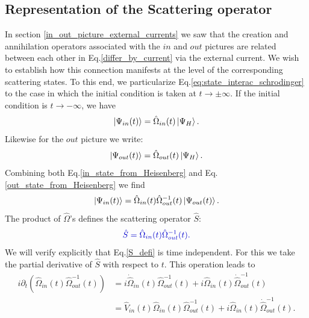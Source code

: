 \documentclass[12pt, titlepage]{article}
\begin{document}
\subsection{Representation of the Scattering operator}\label{Connections}
In section \ref{in_out_picture_external_currents} we saw that the creation and annihilation operators associated with the $ in $ and $ out $ pictures are related between each other in Eq.\enskip\eqref{differ_by_current} via the external current. 
We wish to establish how this connection manifests at the level of the corresponding scattering states. To this end, we particularize Eq.\enskip\eqref{eq:state_interac_schrodinger} to the case in which the initial condition is taken at $ t \rightarrow \pm \infty $.
If the initial condition is $ t \rightarrow - \infty $, we have
\begin{equation}\label{in_state_from_Heisenberg}
\ket{\Psi_{in}(t)}=\hat{\Omega}_{in}(t)\ket{\Psi_{H}}.
\end{equation}
Likewise for the $ out $ picture we write:
\begin{equation}\label{out_state_from_Heisenberg}
\ket{\Psi_{out}(t)}=\hat{\Omega}_{out}(t)\ket{\Psi_{H}}.
\end{equation}
Combining both Eq.\enskip\eqref{in_state_from_Heisenberg} and Eq.\enskip\eqref{out_state_from_Heisenberg} we find
\begin{equation}\label{in_to_out_state}
\ket{\Psi_{in}(t)}=\hat{\Omega}_{in}(t)\hat{\Omega}^{-1}_{out}(t)\ket{\Psi_{out}(t)}.
\end{equation}
The product of $ \hat{\Omega} $'s defines the scattering operator $ \hat{S} $:%
\begin{equation}\label{S_defi}
\textcolor[RGB]{0,0,204}{
	\hat{S}=
	\hat{\Omega}_{in}(t)\hat{\Omega}^{-1}_{out}(t)
	.
}
\end{equation}
We will verify explicitly that Eq.\enskip\eqref{S_defi} is  time independent. For this we take the partial derivative of $ \hat{S} $ with respect to $ t $. This operation leads to
\begin{equation}\label{partial_t_for_indepen}
\begin{split}
i\partial_{t}
\left( \hat{\Omega}_{in}(t)\hat{\Omega}^{-1}_{out}(t) \right)
&= i\dot{\hat{\Omega}}_{in}(t)\hat{\Omega}^{-1}_{out}(t)
 	+ 
 		i\hat{\Omega}_{in}(t)\dot{\hat{\Omega}}^{-1}_{out}(t)
\\
&= \hat{V}_{in}(t)\hat{\Omega}_{in}(t)\hat{\Omega}^{-1}_{out}(t)
	+ 	
		i\hat{\Omega}_{in}(t)\dot{\hat{\Omega}}^{-1}_{out}(t)
.
\end{split}
\end{equation}
\end{document}
